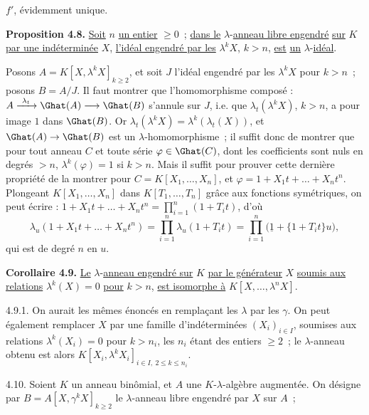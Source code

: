 
\(f'\),
évidemment unique.

\textbf{Proposition 4.8.} \uline{Soit} \(n\) \uline{un entier} \(\ge0\)~; \uline{dans le} \(\lambda\)-\uline{anneau libre engendré} \uline{sur} \(K\) \uline{par une indéterminée} \(X\), \uline{l'idéal engendré par les} \(\lambda^k X\), \(k>n\), \uline{est} \uline{un} \(\lambda\)-\uline{idéal}.

Posons \(A=K[X,\lambda^k X]_{k\ge2}\), et soit \(J\) l'idéal engendré par les \(\lambda^k X\) pour \(k>n\)~; posons \(B=A/J\). Il faut montrer que l'homomorphisme composé : \(A\xrightarrow{\ \lambda_t\ }\Ghat(A)\longrightarrow\Ghat(B)\) s'annule sur \(J\), i.e. que \(\lambda_t(\lambda^k X)\), \(k>n\), a pour image \(1\) dans \(\Ghat(B)\). Or \(\lambda_t(\lambda^k X)=\lambda^k(\lambda_t(X))\), et \(\Ghat(A)\to\Ghat(B)\) est un \(\lambda\)-homomorphisme~; il suffit donc de montrer que pour tout anneau \(C\) et toute série \(\varphi\in\Ghat(C)\), dont les coefficients sont nuls en degrés \(>n\), \(\lambda^k(\varphi)=1\) si \(k>n\). Mais il suffit pour prouver cette dernière propriété de la montrer pour \(C=K[X_1,\ldots,X_n]\), et \(\varphi=1+X_1t+\ldots+X_nt^n\). Plongeant \(K[X_1,\ldots,X_n]\) dans \(K[T_1,\ldots,T_n]\) grâce aux fonctions symétriques, on peut écrire : \(1+X_1t+\ldots+X_nt^n=\prod_{i=1}^{n}(1+T_it)\), d'où
\[
  \lambda_u(1+X_1t+\ldots+X_nt^n)=\prod_{i=1}^{n}\lambda_u(1+T_it)=\prod_{i=1}^{n}\bigl(\underline{1}+\{1+T_it\}u\bigr),
\]
qui est de degré \(n\) en \(u\).

\textbf{Corollaire 4.9.} \uline{Le} \(\lambda\)-\uline{anneau engendré sur} \(K\) \uline{par le générateur} \(X\) \uline{soumis aux relations} \(\lambda^k(X)=0\) \uline{pour} \(k>n\), \uline{est isomorphe à} \(K[X,\ldots,\lambda^n X]\).

4.9.1. On aurait les mêmes énoncés en remplaçant les \(\lambda\) par les \(\gamma\). On peut également remplacer \(X\) par une famille d'indéterminées \((X_i)_{i\in I}\), soumises aux relations \(\lambda^k(X_i)=0\) pour \(k>n_i\), les \(n_i\) étant des entiers \(\ge2\)~; le \(\lambda\)-anneau obtenu est alors \(K[X_i,\lambda^k X_i]_{i\in I,\ 2\le k\le n_i}\).

4.10. Soient \(K\) un anneau binômial, et \(A\) une \(K\)-\(\lambda\)-algèbre augmentée. On désigne par \(B=A[X,\gamma^k X]_{k\ge2}\) le \(\lambda\)-anneau libre engendré par \(X\) sur \(A\)~; 
